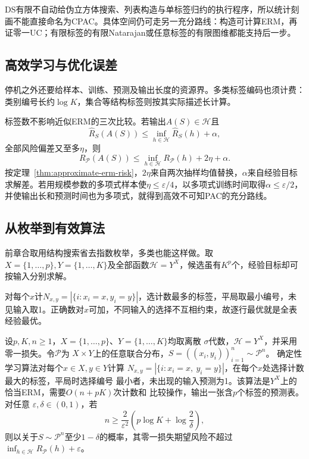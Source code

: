 DS有限不自动给伪立方体搜索、列表构造与单标签归约的执行程序，所以统计刻画不能直接命名为CPAC。具体空间仍可走另一充分路线：构造可计算ERM，再证零一UC；有限标签的有限Natarajan或任意标签的有限图维都能支持后一步。

\subsection{高效学习与优化误差}

停机之外还要给样本、训练、预测及输出长度的资源界。多类标签编码也须计费：类别编号长约$\log K$，集合等结构标签则按其实际描述长计算。

标签数不影响近似ERM的三次比较。若输出$A(S)\in\mathcal H$且
\[
 \hat R_S(A(S))\leq\inf_{h\in\mathcal H}\hat R_S(h)+\alpha,
\]
全部风险偏差又至多$\eta$，则
\[
 R_{\mathcal P}(A(S))\leq\inf_{h\in\mathcal H}R_{\mathcal P}(h)+2\eta+\alpha.
\]
按定理~\ref{thm:approximate-erm-risk}，$2\eta$来自两次抽样均值替换，$\alpha$来自经验目标求解差。若用规模参数的多项式样本使$\eta\leq\varepsilon/4$，以多项式训练时间取得$\alpha\leq\varepsilon/2$，并使输出长和预测时间也为多项式，就得到高效不可知PAC的充分路线。

\subsection{从枚举到有效算法}

前章合取用结构搜索省去指数枚举，多类也能这样做。取$X=\{1,\ldots,p\},Y=\{1,\ldots,K\}$及全部函数$\mathcal H=Y^X$，候选虽有$K^p$个，经验目标却可按输入分别求解。

对每个$x$计$N_{x,y}=|\{i:x_i=x,y_i=y\}|$，选计数最多的标签，平局取最小编号，未见输入取1。正确数对$x$可加，不同输入的选择不互相约束，故逐行最优就是全表经验最优。

\begin{theorem}[有限输入上的多分类表学习]
\label{thm:multiclass-table-erm}
设$p,K,n\geq1$，$X=\{1,\ldots,p\}$、$Y=\{1,\ldots,K\}$均取离散
$\sigma$代数，$\mathcal H=Y^X$，并采用零一损失。令$\mathcal P$为
$X\times Y$上的任意联合分布，$S=((x_i,y_i))_{i=1}^n\sim\mathcal P^n$。
确定性学习算法对每个$x\in X,y\in Y$计算
$N_{x,y}=|\{i:x_i=x,\ y_i=y\}|$，在每个$x$处选择计数最大的标签，平局时选择编号
最小者，未出现的输入预测为1。该算法是$Y^X$上的恰当ERM，需要$O(n+pK)$次计数和
比较操作，输出一张含$p$个标签的预测表。对任意
$\varepsilon,\delta\in(0,1)$，若
\[
 n\geq\frac{2}{\varepsilon^2}
       \left(p\log K+\log\frac2\delta\right),
\]
则以关于$S\sim\mathcal P^n$至少$1-\delta$的概率，其零一损失期望风险不超过
$\inf_{h\in\mathcal H}R_{\mathcal P}(h)+\varepsilon$。
\end{theorem}

